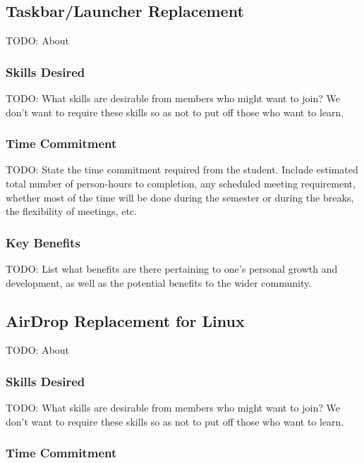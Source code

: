 \documentclass[11pt,fleqn]{article}
\begin{document}
\subsection{Taskbar/Launcher Replacement}

TODO: About

\subsubsection*{Skills Desired}

TODO: What skills are desirable from members who might want to join?  We don't want to require these skills so as not to put off those who want to learn.

\subsubsection*{Time Commitment}

TODO: State the time commitment required from the student.  Include estimated total number of person-hours to completion, any scheduled meeting requirement, whether most of the time will be done during the semester or during the breaks, the flexibility of meetings, etc.

\subsubsection*{Key Benefits}

TODO: List what benefits are there pertaining to one's personal growth and development, as well as the potential benefits to the wider community.

\subsection{AirDrop Replacement for Linux}

TODO: About

\subsubsection*{Skills Desired}

TODO: What skills are desirable from members who might want to join?  We don't want to require these skills so as not to put off those who want to learn.

\subsubsection*{Time Commitment}
\end{document}
